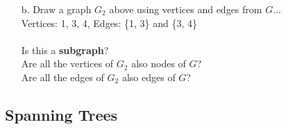 \begin{questionNOGRADE}{\thequestion}
\begin{itemize}
                
            \item[b.]   Draw a graph $G_{2}$ above using vertices and edges from $G$...\\
                Vertices: 1, 3, 4, \tab
                Edges: \{1, 3\} and \{3, 4\} \\ \\
                Is this a \textbf{subgraph}?                         \\
                Are all the vertices of $G_{2}$ also nodes of $G$?    \\
                Are all the edges of $G_{2}$ also edges of $G$?     
        \end{itemize}        
    \end{questionNOGRADE}

    \newpage

    \subsection{Spanning Trees}


